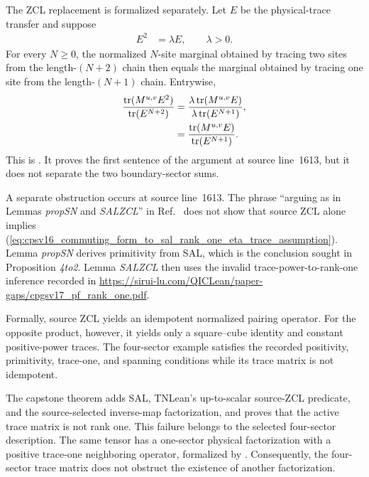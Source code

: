 \documentclass{article}
\begin{document}
The ZCL replacement is formalized separately. Let $E$ be the physical-trace
transfer and suppose
\begin{align}
    E^2
        &=\lambda E,
    \qquad \lambda>0.
    \label{eq:cpsv16_commuting_form_to_sal_source_zcl_transfer_identity}
\end{align}
For every $N\geq0$, the normalized $N$-site marginal obtained by tracing two
sites from the length-$(N+2)$ chain then equals the marginal obtained by
tracing one site from the length-$(N+1)$ chain. Entrywise,
\begin{align}
    \frac{\operatorname{tr}(M^{u,v}E^2)}
         {\operatorname{tr}(E^{N+2})}
        &=
        \frac{\lambda\operatorname{tr}(M^{u,v}E)}
             {\lambda\operatorname{tr}(E^{N+1})},
    \label{eq:cpsv16_commuting_form_to_sal_zcl_two_site_reduction}\\
        &=
        \frac{\operatorname{tr}(M^{u,v}E)}
             {\operatorname{tr}(E^{N+1})}.
    \label{eq:cpsv16_commuting_form_to_sal_zcl_one_site_reduction}
\end{align}
This is
.
It proves the first sentence of the argument at source line~1613, but it does
not separate the two boundary-sector sums.

A separate obstruction occurs at source line~1613. The phrase ``arguing as in
Lemmas \emph{propSN} and \emph{SALZCL}'' in
Ref.~\cite{Cirac2016MPDO_arXiv} does not show that source ZCL alone implies
(\ref{eq:cpsv16_commuting_form_to_sal_rank_one_eta_trace_assumption}). Lemma
\emph{propSN} derives primitivity from SAL, which is the conclusion sought in
Proposition \emph{4to2}. Lemma \emph{SALZCL} then uses the invalid
trace-power-to-rank-one inference recorded in
\url{https://sirui-lu.com/QICLean/paper-gaps/cpgsv17_pf_rank_one.pdf}.

Formally, source ZCL yields an idempotent normalized pairing operator. For the
opposite product, however, it yields only a square--cube identity and constant
positive-power traces. The four-sector example
satisfies the recorded positivity, primitivity, trace-one, and spanning
conditions while its trace matrix is not idempotent.

The capstone theorem
adds SAL, TNLean's up-to-scalar source-ZCL predicate, and the source-selected
inverse-map factorization, and proves that the active trace matrix is not rank
one. This failure belongs to the selected four-sector description. The same
tensor has a one-sector physical factorization with a positive trace-one
neighboring operator, formalized by
.
Consequently, the four-sector trace matrix does not obstruct the existence of
another factorization.
\end{document}
